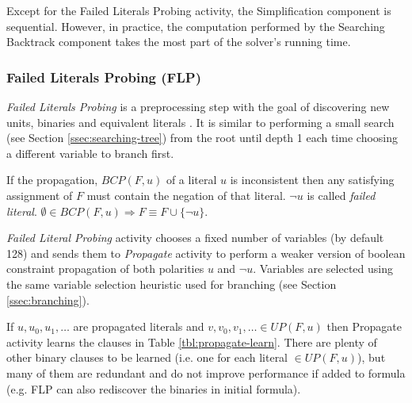 Except for the Failed Literals Probing activity, the Simplification
component is sequential. However, in practice, the computation
performed by the Searching Backtrack component takes the most part
of the solver's running time.


\subsubsection{Failed Literals Probing (FLP)}
\label{sssec:flp}

\emph{Failed Literals Probing} is a preprocessing step with
the goal of discovering new units, binaries and equivalent literals
\cite{Lynce03probing-basedpreprocessing}.  It is similar to
performing a small search (see Section \ref{ssec:searching-tree}) from
the root until depth 1 each time choosing a different variable to
branch first.

\begin{myprop}
  If the propagation, $BCP(F, u)$ of a literal $u$ is inconsistent
  then any satisfying assignment of $F$ must contain the negation
  of that literal. $\neg u$ is called \emph{failed literal}.
  $\emptyset \in BCP(F, u) \Rightarrow F \equiv F \cup \{\neg u\}$.
\end{myprop}


\emph{Failed Literal Probing} activity chooses a fixed number of
variables (by default 128) and sends them to \emph{Propagate}
activity to perform a weaker version of boolean constraint
propagation of both polarities $u$ and $\neg u$. Variables are
selected using the same variable selection heuristic used for
branching (see Section \ref{ssec:branching}).

If $u, u_0, u_1, \ldots$ are propagated literals and $v, v_0, v_1,
\ldots \in UP(F, u)$ then Propagate activity learns the clauses in
Table \ref{tbl:propagate-learn}. There are plenty of other binary
clauses to be learned (i.e. one for each literal $\in UP(F, u)$),
but many of them are redundant and do not improve performance if
added to formula (e.g. FLP can also rediscover the binaries in
initial formula).

\begin{table}[h]
  \centering
  \caption{Learned units and binaries by Propagate activity.}
  \label{tbl:propagate-learn}
\end{table}


